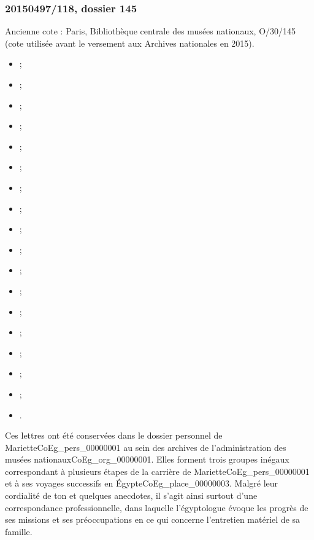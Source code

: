 \documentclass{book}
\begin{document}
\subsubsection*{20150497/118, dossier 145}
\label{CoEg_Mariette_ms_001}
\noindent Ancienne cote : Paris, Bibliothèque centrale des musées nationaux, O/30/145 (cote utilisée avant le versement aux Archives nationales en 2015).
\begin{itemize}
\item {} ;
\item {} ;
\item {} ;
\item {} ;
\item {} ;
\item {} ;
\item {} ;
\item {} ;
\item {} ;
\item {} ;
\item {} ;
\item {} ;
\item {} ;
\item {} ;
\item {} ;
\item {} ;
\item {} ;
\item {}.
\end{itemize} \par
Ces lettres ont été conservées dans le dossier personnel de Mariette\gls{CoEg_pers_00000001} au sein des archives de l'administration des musées nationaux\gls{CoEg_org_00000001}. Elles forment trois groupes inégaux correspondant à plusieurs étapes de la carrière de Mariette\gls{CoEg_pers_00000001} et à ses voyages successifs en Égypte\gls{CoEg_place_00000003}. Malgré leur cordialité de ton et quelques anecdotes, il s’agit ainsi surtout d’une correspondance professionnelle, dans laquelle l’égyptologue évoque les progrès de ses missions et ses préoccupations en ce qui concerne l’entretien matériel de sa famille.\par
\end{document}
